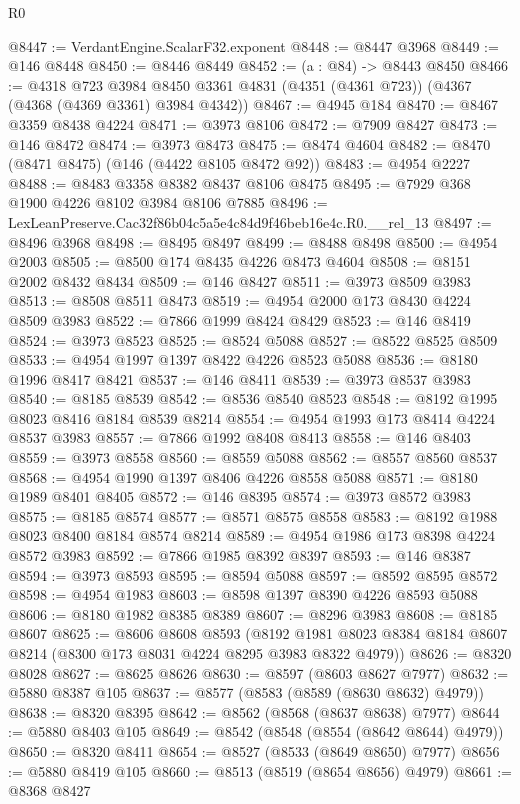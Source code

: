 \begin{lexlean}{R0}
\begin{coremodule}
@8447 := VerdantEngine.ScalarF32.exponent
@8448 := @8447 @3968
@8449 := @146 @8448
@8450 := @8446 @8449
@8452 := (a : @84) -> @8443 @8450
@8466 := @4318
    @723
    @3984
    @8450
    @3361
    @4831
    (@4351 (@4361 @723))
    (@4367 (@4368 (@4369 @3361) @3984 @4342))
@8467 := @4945 @184
@8470 := @8467 @3359 @8438 @4224
@8471 := @3973 @8106
@8472 := @7909 @8427
@8473 := @146 @8472
@8474 := @3973 @8473
@8475 := @8474 @4604
@8482 := @8470 (@8471 @8475) (@146 (@4422 @8105 @8472 @92))
@8483 := @4954 @2227
@8488 := @8483 @3358 @8382 @8437 @8106 @8475
@8495 := @7929 @368 @1900 @4226 @8102 @3984 @8106 @7885
@8496 := LexLeanPreserve.Cac32f86b04c5a5e4c84d9f46beb16e4c.R0.__rel_13
@8497 := @8496 @3968
@8498 := @8495 @8497
@8499 := @8488 @8498
@8500 := @4954 @2003
@8505 := @8500 @174 @8435 @4226 @8473 @4604
@8508 := @8151 @2002 @8432 @8434
@8509 := @146 @8427
@8511 := @3973 @8509 @3983
@8513 := @8508 @8511 @8473
@8519 := @4954 @2000 @173 @8430 @4224 @8509 @3983
@8522 := @7866 @1999 @8424 @8429
@8523 := @146 @8419
@8524 := @3973 @8523
@8525 := @8524 @5088
@8527 := @8522 @8525 @8509
@8533 := @4954 @1997 @1397 @8422 @4226 @8523 @5088
@8536 := @8180 @1996 @8417 @8421
@8537 := @146 @8411
@8539 := @3973 @8537 @3983
@8540 := @8185 @8539
@8542 := @8536 @8540 @8523
@8548 := @8192 @1995 @8023 @8416 @8184 @8539 @8214
@8554 := @4954 @1993 @173 @8414 @4224 @8537 @3983
@8557 := @7866 @1992 @8408 @8413
@8558 := @146 @8403
@8559 := @3973 @8558
@8560 := @8559 @5088
@8562 := @8557 @8560 @8537
@8568 := @4954 @1990 @1397 @8406 @4226 @8558 @5088
@8571 := @8180 @1989 @8401 @8405
@8572 := @146 @8395
@8574 := @3973 @8572 @3983
@8575 := @8185 @8574
@8577 := @8571 @8575 @8558
@8583 := @8192 @1988 @8023 @8400 @8184 @8574 @8214
@8589 := @4954 @1986 @173 @8398 @4224 @8572 @3983
@8592 := @7866 @1985 @8392 @8397
@8593 := @146 @8387
@8594 := @3973 @8593
@8595 := @8594 @5088
@8597 := @8592 @8595 @8572
@8598 := @4954 @1983
@8603 := @8598 @1397 @8390 @4226 @8593 @5088
@8606 := @8180 @1982 @8385 @8389
@8607 := @8296 @3983
@8608 := @8185 @8607
@8625 := @8606
    @8608
    @8593
    (@8192 @1981 @8023 @8384 @8184 @8607 @8214 (@8300 @173 @8031 @4224 @8295 @3983 @8322 @4979))
@8626 := @8320 @8028
@8627 := @8625 @8626
@8630 := @8597 (@8603 @8627 @7977)
@8632 := @5880 @8387 @105
@8637 := @8577 (@8583 (@8589 (@8630 @8632) @4979))
@8638 := @8320 @8395
@8642 := @8562 (@8568 (@8637 @8638) @7977)
@8644 := @5880 @8403 @105
@8649 := @8542 (@8548 (@8554 (@8642 @8644) @4979))
@8650 := @8320 @8411
@8654 := @8527 (@8533 (@8649 @8650) @7977)
@8656 := @5880 @8419 @105
@8660 := @8513 (@8519 (@8654 @8656) @4979)
@8661 := @8368 @8427

\end{coremodule}
\end{lexlean}
